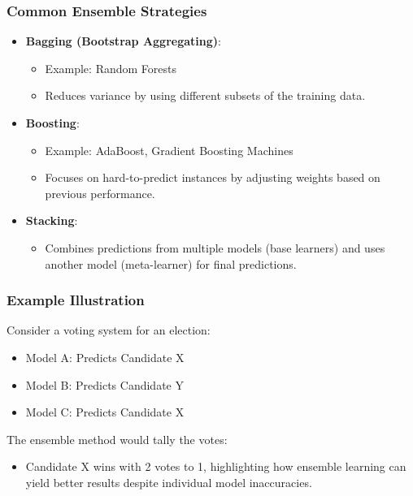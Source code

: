 \documentclass[aspectratio=169]{beamer}
\begin{document}
\begin{frame}[fragile]
    \frametitle{Common Ensemble Strategies}
    \begin{itemize}
        \item \textbf{Bagging (Bootstrap Aggregating)}: 
            \begin{itemize}
                \item Example: Random Forests
                \item Reduces variance by using different subsets of the training data.
            \end{itemize}
        
        \item \textbf{Boosting}:
            \begin{itemize}
                \item Example: AdaBoost, Gradient Boosting Machines
                \item Focuses on hard-to-predict instances by adjusting weights based on previous performance.
            \end{itemize}
        
        \item \textbf{Stacking}:
            \begin{itemize}
                \item Combines predictions from multiple models (base learners) and uses another model (meta-learner) for final predictions.
            \end{itemize}
    \end{itemize}
\end{frame}

\begin{frame}[fragile]
    \frametitle{Example Illustration}
    Consider a voting system for an election:
    \begin{itemize}
        \item Model A: Predicts Candidate X
        \item Model B: Predicts Candidate Y
        \item Model C: Predicts Candidate X
    \end{itemize}
    The ensemble method would tally the votes:
    \begin{itemize}
        \item Candidate X wins with 2 votes to 1, highlighting how ensemble learning can yield better results despite individual model inaccuracies.
    \end{itemize}
\end{frame}
\end{document}
